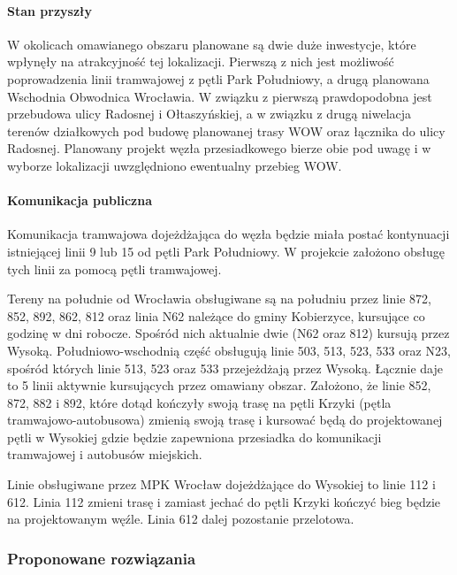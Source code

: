 \documentclass[twoside,12pt]{article}
\begin{document}
		\paragraph{Stan przyszły}\mbox{}
		
		W okolicach omawianego obszaru planowane są dwie duże inwestycje, które wpłynęły na atrakcyjność tej lokalizacji. Pierwszą z nich jest możliwość poprowadzenia linii tramwajowej z pętli Park Południowy, a drugą planowana Wschodnia Obwodnica Wrocławia. W związku z pierwszą prawdopodobna jest przebudowa ulicy Radosnej i Ołtaszyńskiej, a w związku z drugą niwelacja terenów działkowych pod budowę planowanej trasy WOW oraz łącznika do ulicy Radosnej. Planowany projekt węzła przesiadkowego bierze obie pod uwagę i w wyborze lokalizacji uwzględniono ewentualny przebieg WOW.
		
		\paragraph{Komunikacja publiczna}\mbox{}
		
		Komunikacja tramwajowa dojeżdżająca do węzła będzie miała postać kontynuacji istniejącej linii 9 lub 15 od pętli Park Południowy. W projekcie założono obsługę tych linii za pomocą pętli tramwajowej.
		
		Tereny na południe od Wrocławia obsługiwane są na południu przez linie 872, 852, 892, 862, 812 oraz linia N62 należące do gminy Kobierzyce, kursujące co godzinę w dni robocze. Spośród nich aktualnie dwie (N62 oraz 812) kursują przez Wysoką. Południowo-wschodnią część obsługują linie 503, 513, 523, 533 oraz N23, spośród których linie 513, 523 oraz 533 przejeżdżają przez Wysoką. Łącznie daje to 5 linii aktywnie kursujących przez omawiany obszar. Założono, że linie 852, 872, 882 i 892, które dotąd kończyły swoją trasę na pętli Krzyki (pętla tramwajowo-autobusowa) zmienią swoją trasę i kursować będą do projektowanej pętli w Wysokiej gdzie będzie zapewniona przesiadka do komunikacji tramwajowej i autobusów miejskich. 
	
	Linie obsługiwane przez MPK Wrocław dojeżdżające do Wysokiej to linie 112 i 612. Linia 112 zmieni trasę i zamiast jechać do pętli Krzyki kończyć bieg będzie na projektowanym węźle. Linia 612 dalej pozostanie przelotowa.
	
	\subsubsection{Proponowane rozwiązania}
	
\end{document}
